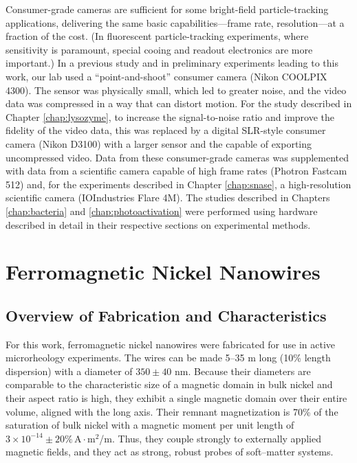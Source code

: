 Consumer-grade cameras are sufficient for some bright-field particle-tracking applications, delivering the same basic capabilities---frame rate, resolution---at a fraction of the cost. (In fluorescent particle-tracking experiments, where sensitivity is paramount, special cooing and readout electronics are more important.) In a previous study and in preliminary experiments leading to this work, our lab used a ``point-and-shoot'' consumer camera (Nikon COOLPIX 4300). The sensor was physically small, which led to greater noise, and the video data was compressed in a way that can distort motion. For the study described in Chapter \ref{chap:lysozyme}, to increase the signal-to-noise ratio and improve the fidelity of the video data, this was replaced by a digital SLR-style consumer camera (Nikon D3100) with a larger sensor and the capable of exporting uncompressed video. Data from these consumer-grade cameras was supplemented with data from a scientific camera capable of high frame rates (Photron Fastcam 512) and, for the experiments described in Chapter \ref{chap:snase}, a high-resolution scientific camera (IOIndustries Flare 4M). The studies described in Chapters \ref{chap:bacteria} and \ref{chap:photoactivation} were performed using hardware described in detail in their respective sections on experimental methods.

\section{Ferromagnetic Nickel Nanowires}

\subsection{Overview of Fabrication and Characteristics}

For this work, ferromagnetic nickel nanowires were fabricated for use in active microrheology experiments. The wires can be made 5--35 \textmu m long (10\% length dispersion\cite{Hultgren2004,Hultgren2005}) with a diameter of $350 \pm 40$ nm\cite{Hultgren2004,Hultgren2005}. Because their diameters are comparable to the characteristic size of a magnetic domain in bulk nickel and their aspect ratio is high, they exhibit a single magnetic domain over their entire volume, aligned with the long axis. Their remnant magnetization is 70\% of the saturation of bulk nickel\cite{Sun1999} with a magnetic moment per unit length of $3 \times 10^{-14}\pm20\% \,\text{A}\cdot\text{m}^2$/\textmu m. Thus, they couple strongly to externally applied magnetic fields, and they act as strong, robust probes of soft--matter systems.

